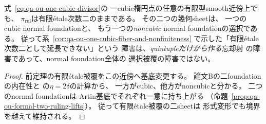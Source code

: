 \begin{corollary}[一cubic境界を横断する内在的二sheetの実現]
\label{cor:qa-ruling-cover-one-cubic-extension}
式~\eqref{eq:qa-ou-one-cubic-divisor}の
一cubic楕円点の任意の有限型smooth近傍上でも、
$\pi_{\mathrm{rul}}$は有限étale次数二のままである。
その二つの幾何sheetは、
一つのcubic normal foundationと、
もう一つの\emph{noncubic} normal foundationの選択である。
従って系~\ref{cor:qa-ou-one-cubic-fiber-and-nonfiniteness}
で示した「有限étale次数二として延長できない」という
障害は、\emph{quintupleだけから作る}忘却射
の障害であって、normal foundation全体の
選択被覆の障害ではない。
\end{corollary}
\begin{proof}
前定理の有限étale被覆をこの近傍へ基底変更する。
論文Bの二foundationの内在性と
\cite[\texttt{lem:elliptic-two-reflections}]{QuadricModuli2026}
の$\eta=2\delta$の計算から、
一方がcubic、他方がnoncubicと分かる。
二つのnormal foundationは
Artin基底でそれぞれ一意に持ち上がる
（命題~\ref{prop:qa-ou-formal-two-ruling-lifts}）。
従って有限étale被覆の二sheetは
形式変形でも境界を越えて維持される。
\end{proof}

